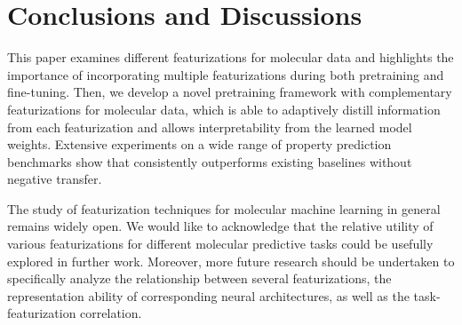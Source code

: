\section{Conclusions and Discussions}
\label{sec:conclusion}

This paper examines different featurizations for molecular data and highlights the importance of incorporating multiple featurizations during both pretraining and fine-tuning.
Then, we develop a novel pretraining framework \themodel with complementary featurizations for molecular data, which is able to adaptively distill information from each featurization and allows interpretability from the learned model weights.
Extensive experiments on a wide range of property prediction benchmarks show that \themodel consistently outperforms existing baselines without negative transfer.

The study of featurization techniques for molecular machine learning in general remains widely open.
We would like to acknowledge that the relative utility of various featurizations for different molecular predictive tasks could be usefully explored in further work.
Moreover, more future research should be undertaken to specifically analyze the relationship between several featurizations, the representation ability of corresponding neural architectures, as well as the task-featurization correlation.
